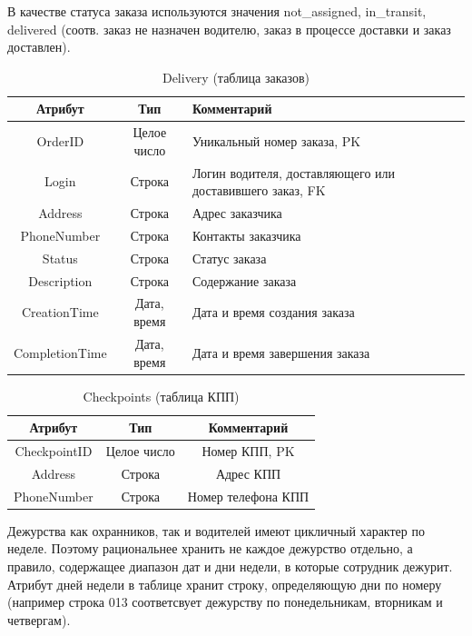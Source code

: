 В качестве статуса заказа используются значения not\_assigned, in\_transit, delivered (соотв. заказ не назначен водителю, заказ в процессе доставки и заказ доставлен).
\begin{table}[h!] \label{del_table}
	\begin{center}
		\caption{Delivery (таблица заказов)}
		\begin{tabular}{| c | c | p{10cm} |}
			\hline
			\textbf{Атрибут}		&	\textbf{Тип}		& \textbf{Комментарий} \\
			\hline
			OrderID		&	Целое число	&	Уникальный номер заказа, PK \\ \hline
			Login 		&	Строка		&	Логин водителя, доставляющего или доставившего заказ, FK \\ \hline
			Address 	&	Строка 		&	Адрес заказчика \\ \hline
			PhoneNumber	&	Строка 		&	Контакты заказчика \\ \hline
			Status 		& 	Строка		&	Статус заказа \\ \hline
			Description	& 	Строка		&	Содержание заказа \\ \hline
			CreationTime	& Дата, время	&	Дата и время создания заказа \\ \hline
			CompletionTime	& Дата, время	&	Дата и время завершения заказа \\ \hline
		\end{tabular}
	\end{center}
\end{table}

\begin{table}[h!] \label{checkp_table}
	\begin{center}
		\caption{Checkpoints (таблица КПП)}
		\begin{tabular}{| c | c | c |}
			\hline
			\textbf{Атрибут}		&	\textbf{Тип}		& \textbf{Комментарий} \\
			\hline
			CheckpointID	&	Целое число	&	Номер КПП, PK \\ \hline
			Address			&	Строка		&	Адрес КПП \\ \hline
			PhoneNumber		&	Строка		&	Номер телефона КПП \\ \hline
		\end{tabular}
	\end{center}
\end{table}


Дежурства как охранников, так и водителей имеют цикличный характер по неделе. Поэтому рациональнее хранить не каждое дежурство отдельно, а правило, содержащее диапазон дат и дни недели, в которые сотрудник дежурит. Атрибут дней недели в таблице хранит строку, определяющую дни по номеру (например строка 013 соответсвует дежурству по понедельникам, вторникам и четвергам).

